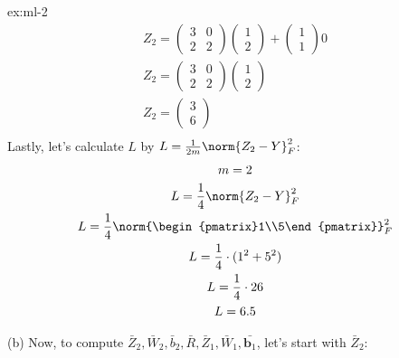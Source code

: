 \begin{solution}{ex:ml-2}
\[\begin{gathered}
      Z_2=\begin{pmatrix}3&0\\2&2\end{pmatrix}\begin{pmatrix}1\\2\end{pmatrix}+\begin{pmatrix}1\\1\end{pmatrix}0\\
      Z_2=\begin{pmatrix}3&0\\2&2\end{pmatrix}\begin{pmatrix}1\\2\end{pmatrix}\\
      Z_2=\begin{pmatrix}3\\6\end{pmatrix}\\
    \end{gathered}
  \]
  Lastly, let's calculate $L$ by $L=\frac{1}{2m}\norm{Z_2-Y}_F^2$:
  \[
    \begin{gathered}
      m=2\\
      L=\frac{1}{4}\norm{Z_2-Y}_F^2\\
      L=\frac{1}{4}\norm{\begin{pmatrix}1\\5\end{pmatrix}}_F^2\\
      L=\frac{1}{4}\cdot (1^2 + 5^2)\\
      L=\frac{1}{4}\cdot 26\\
      L=6.5\\
    \end{gathered}
  \]

  (b) Now, to compute $\bar Z_2, \bar W_2, \bar b_2, \bar R, \bar Z_1, \bar W_1, \bar{\mathbf{b}_1}$, let's start with $\bar Z_2$:


\end{solution}

